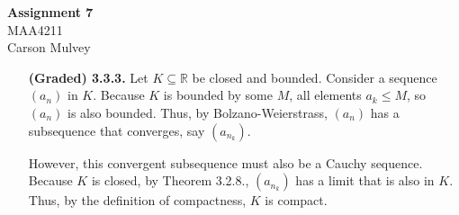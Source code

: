 \documentclass[11pt,letterpaper]{article}
\newcommand{\R}{\mathbb{R}}
\begin{document}
\begin{center}
    \begin{large}
        \textbf{Assignment 7} \\
        MAA4211 \\
        Carson Mulvey
    \end{large}
\end{center}

\begin{enumerate}
    \item[\textbf{(Graded) 3.3.3.}]
        Let $K \subseteq \R$ be closed and bounded. Consider a sequence $(a_n)$ in $K$. Because $K$ is bounded by some $M$, all elements $a_k\leq M$, so $(a_n)$ is also bounded. Thus, by Bolzano-Weierstrass, $(a_n)$ has a subsequence that converges, say $(a_{n_k})$.

        However, this convergent subsequence must also be a Cauchy sequence. Because $K$ is closed, by Theorem 3.2.8., $(a_{n_k})$ has a limit that is also in $K$. Thus, by the definition of compactness, $K$ is compact.
\end{enumerate}
\end{document}
